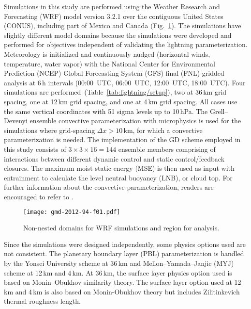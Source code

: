 Simulations in this study are performed using the Weather Research and
Forecasting (WRF) model version 3.2.1 \citep{Skamarock:2008xx} over the
contiguous United States (CONUS), including part of Mexico and Canada
(Fig.~\ref{fig:lightning/domain}). The simulations have slightly different model
domains because the simulations were developed and performed for objectives
independent of validating the lightning parameterization. Meteorology is
initialized and continuously nudged (horizontal winds, temperature, water
vapor) with the National Center for Environmental Prediction (NCEP) Global
Forecasting System (GFS) final (FNL) gridded analysis at 6\,h intervals
(00:00~UTC, 06:00~UTC, 12:00~UTC, 18:00~UTC).
Four simulations are performed~(Table~\ref{tab:lightning/setup}),
two at 36\,\unit{km} grid spacing, one at 12\,\unit{km} grid spacing, and one
at 4\,\unit{km} grid spacing. All cases use the same vertical coordinates
with 51 sigma levels up to 10\,\unit{hPa}. The Grell--Devenyi ensemble
convective parameterization \citep{Grell:2002bs} with \citet{Thompson:2008vn}
microphysics is used for the simulations where grid-spacing $\Delta x >
10$\,km, for which a convective parameterization is needed. The
implementation of the GD scheme employed in this study consists of $3 \times
3 \times 16=144$ ensemble members comprising of interactions between
different dynamic control and static control/feedback closures. The maximum
moist static energy (MSE) is then used as input with entrainment to calculate
the level neutral buoyancy (LNB), or cloud top. For further information about
the convective parameterization, readers are encouraged to refer to
\citet{Grell:1993dz}.

\begin{figure}[t]
      \texttt{[image: gmd-2012-94-f01.pdf]}
      \caption{Non-nested domains for WRF simulations and region for analysis.}
      \label{fig:lightning/domain}
\end{figure}

Since the simulations were designed independently, some physics options used
are not consistent. The planetary \mbox{boundary} layer (PBL) parameterization is
handled by the Yonsei University scheme \citep{Hong:2006fk} at 36\,\unit{km}
and Mellon--Yamada--Janjic (MYJ) scheme \citep{Janjic:1994fk} at 12\,\unit{km}
and 4\,\unit{km}. At 36\,\unit{km}, the surface layer physics option used is
based on Monin--Obukhov similarity theory. The surface layer option used at
12\,\unit{km} and 4\,\unit{km} is also based on Monin-Obukhov theory but
includes Zilitinkevich thermal roughness length.

